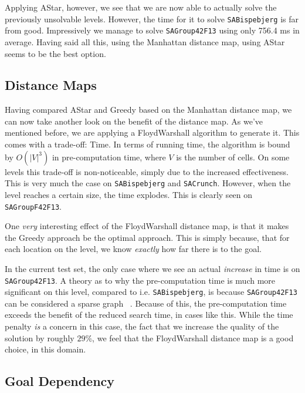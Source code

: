 \documentclass[letterpaper]{article}
\begin{document}
		Applying AStar, however, we see that we are now able to actually solve the previously unsolvable levels. However, the time for it to solve \verb=SABispebjerg= is far from good. Impressively we manage to solve \verb=SAGroup42F13= using only 756.4 ms in average. Having said all this, using the Manhattan distance map, using AStar seems to be the best option.


	\subsection{Distance Maps}
		Having compared AStar and Greedy based on the Manhattan distance map, we can now take another look on the benefit of the distance map. As we've mentioned before, we are applying a FloydWarshall algorithm to generate it. This comes with a trade-off: Time. In terms of running time, the algorithm is bound by $O(|V|^3)$ in pre-computation time, where $V$ is the number of cells. On some levels this trade-off is non-noticeable, simply due to the increased effectiveness. This is very much the case on \verb=SABispebjerg= and \verb=SACrunch=. However, when the level reaches a certain size, the time explodes. This is clearly seen on \verb=SAGroupF42F13=.

		One \emph{very} interesting effect of the FloydWarshall distance map, is that it makes the Greedy approach be the optimal approach. This is simply because, that for each location on the level, we know \emph{exactly} how far there is to the goal.

		In the current test set, the only case where we see an actual \emph{increase} in time is on \verb=SAGroup42F13=. A theory as to why the pre-computation time is much more significant on this level, compared to i.e. \verb=SABispebjerg=, is because \verb=SAGroup42F13= can be considered a sparse graph ~\cite{sparse}. Because of this, the pre-computation time exceeds the benefit of the reduced search time, in cases like this. While the time penalty \emph{is} a concern in this case, the fact that we increase the quality of the solution by roughly $29\%$, we feel that the FloydWarshall distance map is a good choice, in this domain.

	\subsection{Goal Dependency}
\end{document}
